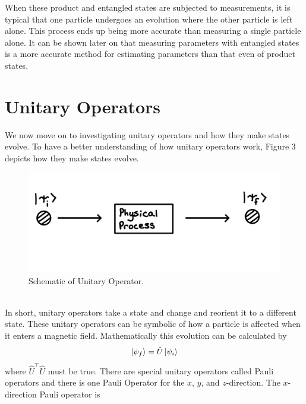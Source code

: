\documentclass[twocolumn]{article}
\begin{document}
When these product and entangled states are subjected to measurements, it is typical that one particle undergoes an evolution where the other particle is left alone. This process ends up being more accurate than measuring a single particle alone. It can be shown later on that measuring parameters with entangled states is a more accurate method for estimating parameters than that even of product states.
\section*{Unitary Operators}
We now move on to investigating unitary operators and how they make states evolve. To have a better understanding of how unitary operators work, Figure 3 depicts how they make states evolve.
\begin{figure}[htpb]
\begin{center}
\includegraphics[width=0.90\linewidth]{Unitary-Operator.PNG}
\caption{Schematic of Unitary Operator.}
\end{center}
\end{figure}\\
In short, unitary operators take a state and change and reorient it to a different state. These unitary operators can be symbolic of how a particle is affected when it enters a magnetic field. Mathematically this evolution can be calculated by
\begin{equation}\label{eq:12}
\ket{\psi_f}=\hat{U}\ket{\psi_i}
\end{equation}
where $\hat{U}^{\intercal}\hat{U}$ must be true. There are special unitary operators called Pauli operators and there is one Pauli Operator for the $x$, $y$, and $z$-direction. The $x$-direction Pauli operator is
\end{document}
